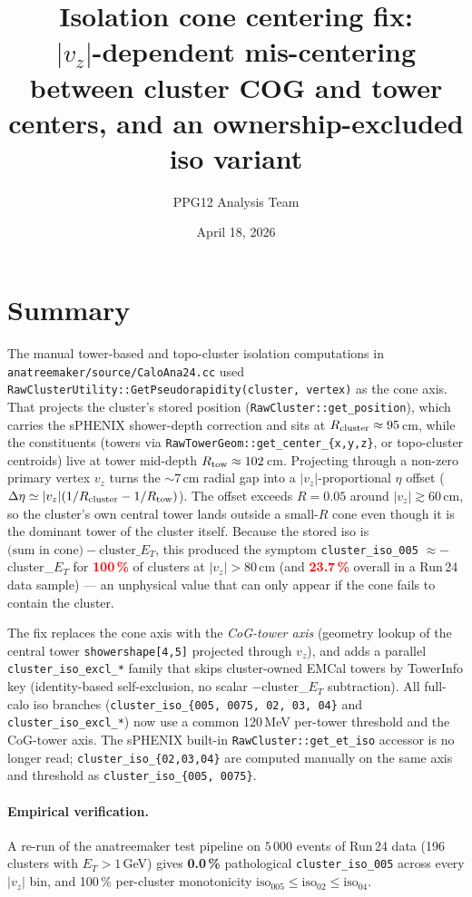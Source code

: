 \documentclass[11pt,a4paper]{article}
\title{Isolation cone centering fix:\\
\large $|v_z|$-dependent mis-centering between cluster COG and tower centers,
and an ownership-excluded iso variant}
\author{PPG12 Analysis Team}
\date{April 18, 2026}
\newcommand{\crit}[1]{\textcolor{red}{\textbf{#1}}}
\newcommand{\fix}[1]{\textcolor[rgb]{0,0.5,0}{\textbf{#1}}}
\newcommand{\branch}[1]{\texttt{\small #1}}
\begin{document}
\maketitle

\section*{Summary}

The manual tower-based and topo-cluster isolation computations in
\branch{anatreemaker/source/CaloAna24.cc} used \branch{RawClusterUtility::GetPseudorapidity(cluster, vertex)}
as the cone axis. That projects the cluster's stored position
(\branch{RawCluster::get\_position}), which carries the sPHENIX shower-depth
correction and sits at $R_{\rm cluster} \approx 95$\,cm, while the constituents
(towers via \branch{RawTowerGeom::get\_center\_\{x,y,z\}}, or topo-cluster centroids)
live at tower mid-depth $R_{\rm tow} \approx 102$\,cm. Projecting through a
non-zero primary vertex $v_z$ turns the $\sim 7$\,cm radial gap into a
$|v_z|$-proportional $\eta$ offset
($\Delta\eta \simeq |v_z|(1/R_{\rm cluster} - 1/R_{\rm tow})$). The offset
exceeds $R = 0.05$ around $|v_z| \gtrsim 60$\,cm, so the cluster's own central
tower lands outside a small-$R$ cone even though it is the dominant tower of
the cluster itself. Because the stored iso is
$\text{(sum in cone)} - \text{cluster\_}E_T$, this produced the symptom
\branch{cluster\_iso\_005} $\approx -$cluster\_$E_T$ for \crit{100\,\%} of
clusters at $|v_z| > 80$\,cm (and \crit{23.7\,\%} overall in a Run\,24 data
sample) --- an unphysical value that can only appear if the cone fails to
contain the cluster.

The fix replaces the cone axis with the \emph{CoG-tower axis}
(geometry lookup of the central tower \branch{showershape[4,5]} projected
through $v_z$), and adds a parallel \branch{cluster\_iso\_excl\_*} family that
skips cluster-owned EMCal towers by TowerInfo key (identity-based self-exclusion,
no scalar $-$cluster\_$E_T$ subtraction). All full-calo iso branches
(\branch{cluster\_iso\_\{005, 0075, 02, 03, 04\}} and
\branch{cluster\_iso\_excl\_*}) now use a common 120\,MeV per-tower threshold
and the CoG-tower axis. The sPHENIX built-in \branch{RawCluster::get\_et\_iso}
accessor is no longer read; \branch{cluster\_iso\_\{02,03,04\}} are computed
manually on the same axis and threshold as \branch{cluster\_iso\_\{005, 0075\}}.

\paragraph{Empirical verification.}
A re-run of the anatreemaker test pipeline on $5\,000$ events of Run\,24 data
(196 clusters with $E_T > 1$\,GeV) gives \fix{0.0\,\%} pathological
\branch{cluster\_iso\_005} across every $|v_z|$ bin, and 100\,\% per-cluster
monotonicity $\text{iso}_{005} \le \text{iso}_{02} \le \text{iso}_{04}$.
\end{document}
